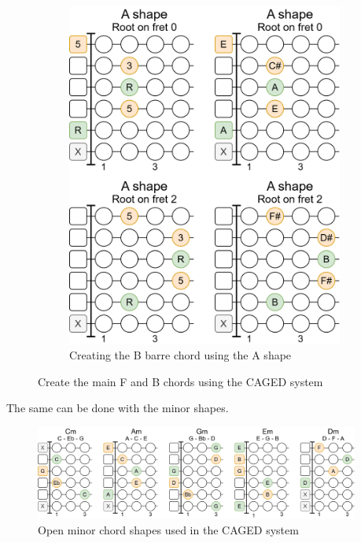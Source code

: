 \begin{figure}[h]
\begin{subfigure}{0.37\textwidth}
		\includegraphics[width=\textwidth]{../../Images/CagedAShapeToBChord.png}
		\caption{Creating the B barre chord using the A shape}
		\label{fig:guitar_caged_a_shape_to_b}
	\end{subfigure}
	\label{fig:guitar_caged_create_main_f_b_barre_chords}
	\caption{Create the main F and B chords using the CAGED system}
\end{figure}

\newpage

The same can be done with the minor shapes.

\begin{figure}[h]
	\centering
	\includegraphics[width=0.95\textwidth]{../../Images/CagedOpenMinorChords.png}
	\caption{Open minor chord shapes used in the CAGED system}
	\label{fig:guitar_caged_open_minor_chords}
\end{figure}

